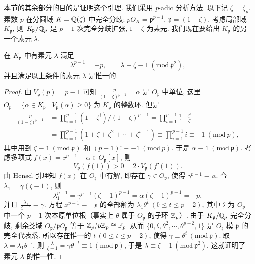本节的其余部分的目的是证明这个引理. 我们采用 $p$-adic 分析方法. 以下记 $\zeta=\zeta_p$. 素数 $p$ 在分圆域 $K=\mathbb{Q}(\zeta)$ 中完全分歧: $pO_K=\mathfrak{p}^{p-1}$, $\mathfrak{p}=(1-\zeta)$. 考虑局部域 $K_{\mathfrak{p}}$, 则 $K_{\mathfrak{p}}/\mathbb{Q}_p$ 是 $p-1$ 次完全分歧扩张, $1-\zeta$ 为素元. 我们现在要给出 $K_{\mathfrak{p}}$ 的另一个素元 $\lambda$.

\begin{lemma}\label{lem:ch9-2}
在 $K_{\mathfrak{p}}$ 中有素元 $\lambda$ 满足
\[
  \lambda^{p-1}=-p,\qquad\lambda\equiv\zeta-1\ (\mathrm{mod}\ \mathfrak{p}^2),
\]
并且满足以上条件的素元 $\lambda$ 是惟一的.
\end{lemma}

\begin{proof}
由 $V_{\mathfrak{p}}(p)=p-1$ 可知 $\frac{-p}{(1-\zeta)^{p-1}}=\alpha$ 是 $O_{\mathfrak{p}}$ 中单位, 这里 $O_{\mathfrak{p}}=\{\alpha\in K_{\mathfrak{p}}\mid V_{\mathfrak{p}}(\alpha)\geqslant 0\}$ 为 $K_{\mathfrak{p}}$ 的整数环. 但是
\begin{align*}
  \frac{p}{(1-\zeta)^{p-1}}&=\prod_{i=1}^{p-1}(1-\zeta^i)\Big/(1-\zeta)^{p-1}
  =\prod_{i=1}^{p-1}\frac{1-\zeta^i}{1-\zeta}\\
  &=\prod_{i=1}^{p-1}(1+\zeta+\zeta^2+\cdots+\zeta^{i-1})
  \equiv\prod_{i=1}^{p-1}i\equiv -1\ (\mathrm{mod}\ p),
\end{align*}
其中用到 $\zeta\equiv 1\ (\mathrm{mod}\ \mathfrak{p})$ 和 $(p-1)!\equiv -1\ (\mathrm{mod}\ p)$. 于是 $\alpha\equiv 1\ (\mathrm{mod}\ \mathfrak{p})$. 考虑多项式 $f(x)=x^{p-1}-\alpha\in O_{\mathfrak{p}}[x]$, 则
\[
  V_{\mathfrak{p}}(f(1))>0=2\cdot V_{\mathfrak{p}}(f'(1)).
\]
由 Hensel 引理知 $f(x)$ 在 $O_{\mathfrak{p}}$ 中有解, 即存在 $\gamma\in O_{\mathfrak{p}}$, 使得 $\gamma^{p-1}=\alpha$. 令 $\lambda_1=\gamma(\zeta-1)$, 则
\[
  \lambda_1^{p-1}=\gamma^{p-1}(\zeta-1)^{p-1}=\alpha(\zeta-1)^{p-1}=-p,
\]
并且 $\frac{\lambda_1}{\zeta-1}=\gamma$. 方程 $x^{p-1}=-p$ 的全部解为 $\lambda_1\theta^t\ (0\leqslant t\leqslant p-2)$, 其中 $\theta$ 为 $O_{\mathfrak{p}}$ 中一个 $p-1$ 次本原单位根（事实上 $\theta$ 属于 $O_{\mathfrak{p}}$ 的子环 $\mathbb{Z}_p$）. 由于 $K_{\mathfrak{p}}/\mathbb{Q}_p$ 完全分歧, 剩余类域 $O_{\mathfrak{p}}/\mathfrak{p}O_{\mathfrak{p}}$ 等于 $\mathbb{Z}_p/p\mathbb{Z}_p\cong\mathbb{F}_p$, 从而 $\{0,\theta,\theta^2,\cdots,\theta^{p-2},1\}$ 是 $O_{\mathfrak{p}}$ 模 $\mathfrak{p}$ 的完全代表系. 所以存在惟一的 $t\ (0\leqslant t\leqslant p-2)$, 使得 $\gamma\equiv\theta^t\ (\mathrm{mod}\ \mathfrak{p})$. 取 $\lambda=\lambda_1\theta^{-t}$, 则 $\frac{\lambda}{\zeta-1}=\gamma\theta^{-t}\equiv 1\ (\mathrm{mod}\ \mathfrak{p})$, 于是 $\lambda\equiv\zeta-1\ (\mathrm{mod}\ \mathfrak{p}^2)$. 这就证明了素元 $\lambda$ 的惟一性.
\end{proof}

